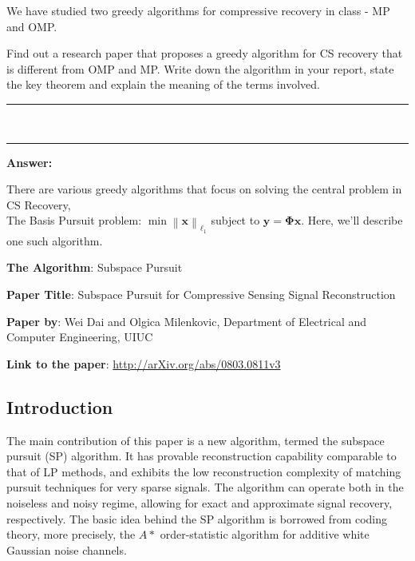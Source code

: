 \documentclass[fleqn, 11pt]{article}
\newcommand{\bs}[1]{\boldsymbol{#1}}
\newcommand\norm[1]{\left\lVert#1\right\rVert}
\newcommand{\HRule}{\rule{\linewidth}{0.5mm}}
\begin{document}
\smallskip
We have studied two greedy algorithms for compressive recovery in class - MP and OMP.

\smallskip

Find out a research paper that proposes a greedy algorithm for CS recovery that is
different from OMP and MP. Write down the algorithm in your report, state the key theorem and explain the
meaning of the terms involved.

\vspace{10pt}

\begin{spacing}{0.05}
\noindent
\HRule\\
\HRule
\end{spacing}

\vspace{10pt}

\medskip

\textbf{\large Answer: }

\medskip

There are various greedy algorithms that focus on solving the central problem in CS Recovery, \\
The Basis Pursuit problem: $\min \norm{\bs{x}}_{\ell_1} $ subject to $\bs{y = \Phi x}$. 
Here, we'll describe one such algorithm.

\medskip

\textbf{The Algorithm}: Subspace Pursuit 

\medskip

\textbf{Paper Title}: Subspace Pursuit for Compressive Sensing Signal
Reconstruction

\medskip

\textbf{Paper by}: Wei Dai and Olgica Milenkovic, 
Department of Electrical and Computer Engineering, UIUC

\medskip

\textbf{Link to the paper}: \url{http://arXiv.org/abs/0803.0811v3}

\hrulefill

\subsection*{Introduction}

The main contribution of this paper is a new algorithm,
termed the subspace pursuit (SP) algorithm. It has provable
reconstruction capability comparable to that of LP methods,
and exhibits the low reconstruction complexity of matching
pursuit techniques for very sparse signals. The algorithm can
operate both in the noiseless and noisy regime, allowing
for exact and approximate signal recovery, respectively.
The basic idea behind the SP algorithm is borrowed from
coding theory, more precisely, the $A*$ order-statistic algorithm  
for additive white Gaussian noise channels.
\end{document}

